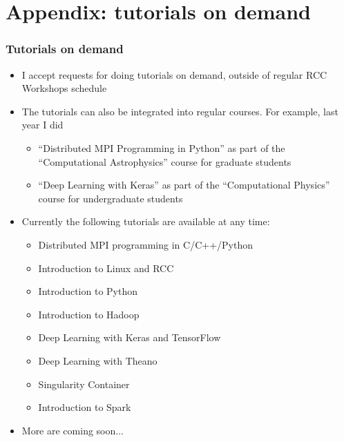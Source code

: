 \section{Appendix: tutorials on demand}
\begin{frame}[fragile]
  \frametitle{Tutorials on demand}
  \begin{itemize}
    \item I accept requests for doing tutorials on demand, outside of regular RCC Workshops schedule
    \item The tutorials can also be integrated into regular courses. For example, last year I did 
      \begin{itemize}
      \item ``Distributed MPI Programming in Python'' as part of the ``Computational Astrophysics'' course for graduate students
      \item ``Deep Learning with Keras'' as part of the ``Computational Physics'' course for undergraduate students
      \end{itemize}
    \item Currently the following tutorials are available at any time:
      \begin{itemize}
        \item Distributed MPI programming in C/C++/Python
        \item Introduction to Linux and RCC
        \item Introduction to Python
        \item Introduction to Hadoop
        \item Deep Learning with Keras and TensorFlow
        \item Deep Learning with Theano
        \item Singularity Container
        \item Introduction to Spark
      \end{itemize}
    \item More are coming soon...
  \end{itemize}
\end{frame}
